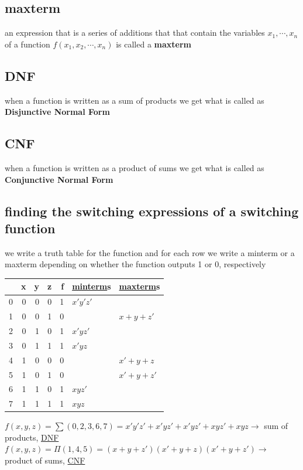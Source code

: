 \documentclass[a4paper,12pt]{article}
\begin{document}
\subsection{maxterm}
\label{sec:orgee1eb6c}
\begin{definition}
an expression that is a series of additions that that contain the variables \(x_1, \cdots, x_n\) of a function \(f(x_1, x_2, \cdots, x_n)\) is called a \textbf{maxterm}\\
\end{definition}
\subsection{DNF}
\label{sec:org03ef0dd}
\begin{definition}
when a function is written as a sum of products we get what is called as \textbf{Disjunctive Normal Form}\\
\end{definition}
\subsection{CNF}
\label{sec:org51d7cda}
\begin{definition}
when a function is written as a product of sums we get what is called as \textbf{Conjunctive Normal Form}\\
\end{definition}
\subsection{finding the switching expressions of a switching function}
\label{sec:orgcfcd2f8}
we write a truth table for the function and for each row we write a minterm or a maxterm depending on whether the function outputs 1 or 0, respectively\\
\begin{tabular}{rrrrrll}
 & x & y & z & f & \hyperref[sec:org07fe4e3]{minterm}s & \hyperref[sec:orgee1eb6c]{maxterm}s\\
\hline
0 & 0 & 0 & 0 & 1 & \(x'y'z'\) & \\
1 & 0 & 0 & 1 & 0 &  & \(x+y+z'\)\\
2 & 0 & 1 & 0 & 1 & \(x'yz'\) & \\
3 & 0 & 1 & 1 & 1 & \(x'yz\) & \\
4 & 1 & 0 & 0 & 0 &  & \(x'+y+z\)\\
5 & 1 & 0 & 1 & 0 &  & \(x'+y+z'\)\\
6 & 1 & 1 & 0 & 1 & \(xyz'\) & \\
7 & 1 & 1 & 1 & 1 & \(xyz\) & \\
\end{tabular}
\(f(x, y, z) = \sum(0,2,3,6,7) = x'y'z' + x'yz' + x'yz' + xyz' + xyz \longrightarrow\) sum of products, \hyperref[sec:org03ef0dd]{DNF}\\
\(f(x, y, z) = \Pi(1,4,5) = (x+y+z')(x'+y+z)(x'+y+z') \longrightarrow\) product of sums, \hyperref[sec:org51d7cda]{CNF}\\
\end{document}
